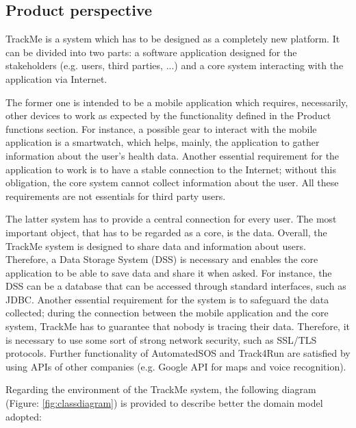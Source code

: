\subsection{Product perspective}
TrackMe is a system which has to be designed as a completely new platform. It can be divided into 
two parts: a software application designed for the stakeholders (e.g. users, third parties, ...) and a 
core system interacting with the application via Internet. 
\par
The former one is intended to be a mobile application which requires, necessarily, other devices to work 
as expected by the functionality defined in the Product functions section. For instance, a possible gear 
to interact with the mobile application is a smartwatch, which helps, mainly, the application to 
gather information about the user's health data. Another essential requirement for the application to 
work is to have a stable connection to the Internet; without this obligation, the core system cannot 
collect information about the user. All these requirements are not essentials for third party users.
\par
The latter system has to provide a central connection for every user. The most important object, that has 
to be regarded as a core, is the data. Overall, the TrackMe system is designed to share data and 
information about users. Therefore, a Data Storage System (DSS) is necessary and enables the 
core application to be able to save data and share it when asked. For instance, the DSS can be a 
database that can be accessed through standard interfaces, such as JDBC. Another essential 
requirement for the system is to safeguard the data collected; during the connection between the 
mobile application and the core system, TrackMe has to guarantee that nobody is tracing their data. 
Therefore, it is necessary to use some sort of strong network security, such as SSL/TLS protocols. 
Further functionality of AutomatedSOS and Track4Run are satisfied by using APIs of other companies 
(e.g. Google API for maps and voice recognition).
\\\par
Regarding the environment of the TrackMe system, the following diagram (Figure: \ref{fig:classdiagram}) 
is provided to describe better the domain model adopted:\\

